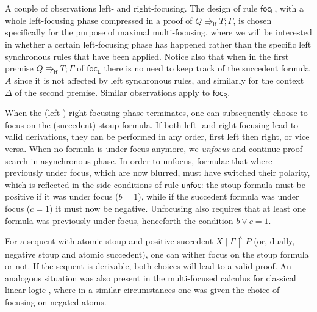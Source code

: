 \documentclass[runningheads]{llncs}
\newcommand{\I}{\mathsf{I}}
\newcommand{\lf}{\Rrightarrow_\mathsf{lf}}
\newcommand{\up}{\Uparrow}
\newcommand{\focL}{\mathsf{foc_L}}
\newcommand{\focR}{\mathsf{foc_R}}
\newcommand{\unfoc}{\mathsf{unfoc}}
\begin{document}
A couple of observations left- and right-focusing. The design of rule $\focL$, with a whole left-focusing phase compressed in a proof of $Q \lf T ; \Gamma$, is chosen specifically for the purpose of maximal multi-focusing, where we will be interested in whether a certain left-focusing phase has happened rather than the specific left synchronous rules that have been applied. Notice also that when in the first premise $Q \lf T ; \Gamma$ of $\focL$ there is no need to keep track of the succedent formula $A$ since it is not affected by left synchronous rules, and similarly for the context $\Delta$ of the second premise. Similar observations apply to $\focR$.


When the (left-) right-focusing phase terminates, one can subsequently choose to focus on the (succedent) stoup formula. If both left- and right-focusing lead to valid derivations, they can be performed in any order, first left then right, or vice versa. When no formula is under focus anymore, we \emph{unfocus} and continue proof search in asynchronous phase. In order to unfocus, formulae that where previously under focus, which are now blurred, must have switched their polarity, which is reflected in the side conditions of rule $\unfoc$: the stoup formula must be positive if it was under focus ($b=1$), while if the succedent formula was under focus ($c = 1$) it must now be negative. Unfocusing also requires that at least one formula was previously under focus, henceforth the condition $b \vee c = 1$.

For a sequent with atomic stoup and positive succedent $X \mid \Gamma \up P$ (or, dually, negative stoup and atomic succedent), one can wither focus on the stoup formula or not. If the sequent is derivable, both choices will lead to a valid proof. An analogous situation was also present in the multi-focused calculus for classical linear logic \cite{chaudhuri:canonical:2008}, where in a similar circumstances one was given the choice of focusing on negated atoms.
\end{document}
